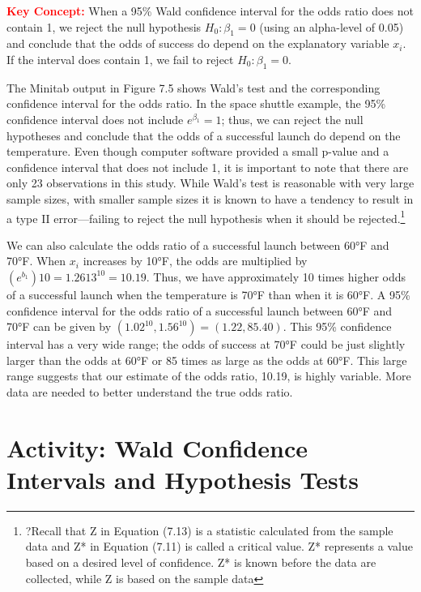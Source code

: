 \documentclass[
]{report}
\begin{document}
\Large

\textbf{\textcolor{red}{Key Concept:}}
\color{red}
When a 95\% Wald confidence interval for the odds ratio does not contain 1, we reject the null hypothesis \(H_0: \beta_1 = 0\) (using an alpha-level of 0.05) and conclude that the odds of success do depend on the explanatory variable \(x_i\). If the interval does contain 1, we fail to reject \(H_0: \beta_1 = 0\).
\color{black}
\normalsize

The Minitab output in Figure 7.5 shows Wald's test and the corresponding confidence interval for the
odds ratio. In the space shuttle example, the 95\% confidence interval does not include \(e^{\beta_1} = 1\); thus, we can
reject the null hypotheses and conclude that the odds of a successful launch do depend on the temperature.
Even though computer software provided a small p-value and a confidence interval that does not include 1, it
is important to note that there are only 23 observations in this study. While Wald's test is reasonable with very
large sample sizes, with smaller sample sizes it is known to have a tendency to result in a type II error---failing
to reject the null hypothesis when it should be rejected.\footnote{?Recall that Z in Equation (7.13) is a statistic calculated from the sample data and Z* in Equation (7.11) is called a critical value. Z* represents a value based on a desired level of confidence. Z* is known before the data are collected, while Z is based on the sample data}

We can also calculate the odds ratio of a successful launch between 60°F and 70°F. When \(x_i\)
increases by 10°F, the odds are multiplied by \((e^{b_1})10 = 1.2613^{10} = 10.19\). Thus, we have approximately
10 times higher odds of a successful launch when the temperature is 70°F than when it is 60°F. A 95\%
confidence interval for the odds ratio of a successful launch between 60°F and 70°F can be given by
\((1.02^10, 1.56^10) = (1.22, 85.40)\). This 95\% confidence interval has a very wide range; the odds of success
at 70°F could be just slightly larger than the odds at 60°F or 85 times as large as the odds at 60°F. This
large range suggests that our estimate of the odds ratio, 10.19, is highly variable. More data are needed to
better understand the true odds ratio.

\hypertarget{activity-wald-confidence-intervals-and-hypothesis-tests-1}{%
\section*{Activity: Wald Confidence Intervals and Hypothesis Tests}\label{activity-wald-confidence-intervals-and-hypothesis-tests-1}}
\end{document}
